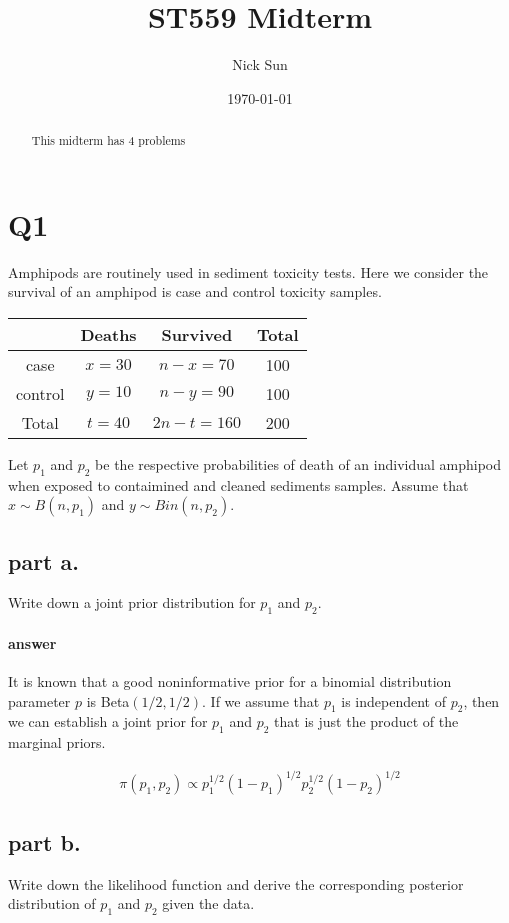 \documentclass[12pt,a4paper]{article}
\title{ST559 Midterm}
\date{\today}
\author{Nick Sun}
\begin{document}
\maketitle

\begin{abstract}
	This midterm has 4 problems
\end{abstract}

\section{Q1}
Amphipods are routinely used in sediment toxicity tests.
Here we consider the survival of an amphipod is case and control toxicity samples.

\begin{center}
\begin{tabular}{c | c | c | c}
	\hline
& Deaths & Survived & Total \\
\hline
	case & $x = 30$ & $n - x = 70$ & 100 \\
	control & $y=10$ & $n-y = 90$ & 100 \\
	\hline
	Total & $t=40$ & $2n-t = 160$ & 200 
\end{tabular}
\end{center}

Let $p_1$ and $p_2$ be the respective probabilities of death of an individual amphipod when exposed to contaimined and cleaned sediments samples.
Assume that $x \sim B(n, p_1)$ and $y \sim Bin(n, p_2)$.

\subsection{part a.}
Write down a joint prior distribution for $p_1$ and $p_2$.

\paragraph{answer} It is known that a good noninformative prior for a binomial distribution parameter $p$ is Beta$(1/2, 1/2)$.
If we assume that $p_1$ is independent of $p_2$, then we can establish a joint prior for $p_1$ and $p_2$ that is just the product of the marginal priors.

\begin{align*}
	\pi(p_1, p_2) \propto p_1^{1/2} (1 - p_1)^{1/2} p_2^{1/2} (1 - p_2)^{1/2}
\end{align*}

\subsection{part b.}
Write down the likelihood function and derive the corresponding posterior distribution of $p_1$ and $p_2$ given the data.
\end{document}
